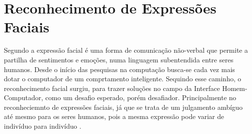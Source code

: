 \chapter{Reconhecimento de Expressões Faciais}

Segundo  a expressão facial é uma forma de comunicação não-verbal que permite a partilha de
sentimentos e emoções, numa linguagem subentendida entre seres humanos. Desde o início das pesquisas na computação busca-se cada vez mais dotar o computador de um comprtamento inteligente. Sequindo esse caminho, o reconhecimento facial surgiu,  para trazer soluções no campo da Interface Homem- Computador, como um desafio esperado, porém desafiador. Principalmente no reconheciemnto de expressões faciais, já que se trata de um julgamento ambíguo até mesmo para os seres humanos, pois a mesma expressão pode variar de indivíduo para indivíduo \cite{FernandoGil} \cite{Elizabeth}.

